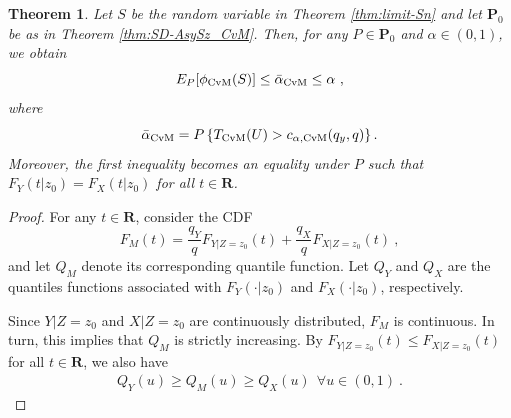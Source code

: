 \documentclass[11pt]{article}
\numberwithin{equation}{section}
\newtheorem{theorem}{Theorem}%
\begin{document}
\begin{theorem}\label{thm:CvM-validity}
Let $S$ be the random variable in Theorem \ref{thm:limit-Sn} and let $\mathbf P_0$ be as in Theorem \ref{thm:SD-AsySz_CvM}. Then, for any $P\in \mathbf P_0$ and $\alpha\in(0,1)$, we obtain 
\[
E_P[ \phi_{\rm CvM} (S)] \leq \bar{\alpha}_{\rm CvM}\le \alpha ~,
\]
where 
$$\Bar{\alpha}_{\rm CvM} = P\left\{T_{\rm CvM}(U) > c_{\alpha,{\rm CvM}}(q_y, q)\right\}.$$
Moreover, the first inequality becomes an equality under $P$ such that  $F_Y(t|z_{0})=F_X(t|z_{0})$ for all $t\in \mathbf R$.
\end{theorem}
\begin{proof}
For any $t \in \mathbf R$, consider the CDF
\[
F_{M}(t) =\frac{q_{Y}}{q}F_{Y| Z= z_0}(t) +\frac{q_{X}}{q}F_{X| Z = z_0}(t)~,
\]
and let $Q_M$ denote its corresponding quantile function. Let $Q_Y$ and $Q_X$ are the quantiles functions associated with $F_Y(\cdot| z_0)$ and $F_X(\cdot| z_0)$, respectively.

Since $Y|Z=z_0$ and $X|Z=z_0$ are continuously distributed, $F_M$ is continuous. In turn, this implies that $Q_M$ is strictly increasing. By $F_{Y| Z= z_0}(t)\leq F_{X| Z= z_0}(t)$ for all $t \in \mathbf R$, we also have
\begin{align}\label{eq:cvm-monotonicity}
 Q_Y(u) \geq Q_M(u) \geq Q_X(u) ~~\forall u\in(0,1)~.
\end{align}


\end{proof}
\end{document}
